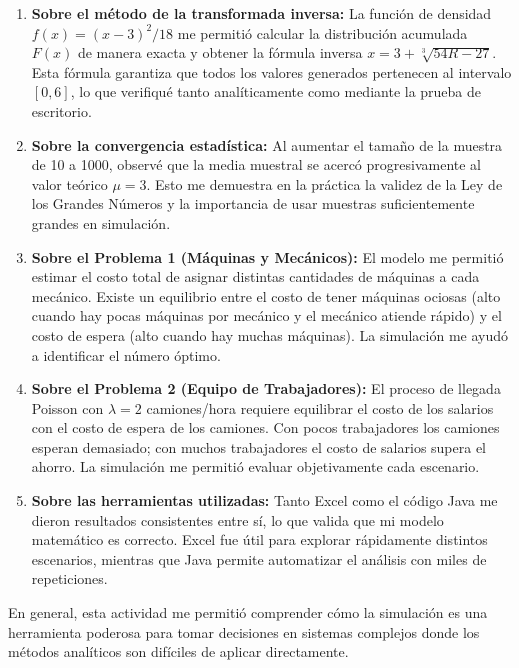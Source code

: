 \documentclass[12pt,a4paper]{article}
\begin{document}
\begin{enumerate}[label=\textbf{\arabic*.}]

  \item \textbf{Sobre el método de la transformada inversa:}
  La función de densidad $f(x) = (x-3)^2/18$ me permitió calcular la distribución acumulada $F(x)$ de manera exacta y obtener la fórmula inversa $x = 3 + \sqrt[3]{54R-27}$. Esta fórmula garantiza que todos los valores generados pertenecen al intervalo $[0, 6]$, lo que verifiqué tanto analíticamente como mediante la prueba de escritorio.

  \item \textbf{Sobre la convergencia estadística:}
  Al aumentar el tamaño de la muestra de 10 a 1000, observé que la media muestral se acercó progresivamente al valor teórico $\mu = 3$. Esto me demuestra en la práctica la validez de la Ley de los Grandes Números y la importancia de usar muestras suficientemente grandes en simulación.

  \item \textbf{Sobre el Problema 1 (Máquinas y Mecánicos):}
  El modelo me permitió estimar el costo total de asignar distintas cantidades de máquinas a cada mecánico. Existe un equilibrio entre el costo de tener máquinas ociosas (alto cuando hay pocas máquinas por mecánico y el mecánico atiende rápido) y el costo de espera (alto cuando hay muchas máquinas). La simulación me ayudó a identificar el número óptimo.

  \item \textbf{Sobre el Problema 2 (Equipo de Trabajadores):}
  El proceso de llegada Poisson con $\lambda = 2$ camiones/hora requiere equilibrar el costo de los salarios con el costo de espera de los camiones. Con pocos trabajadores los camiones esperan demasiado; con muchos trabajadores el costo de salarios supera el ahorro. La simulación me permitió evaluar objetivamente cada escenario.

  \item \textbf{Sobre las herramientas utilizadas:}
  Tanto Excel como el código Java me dieron resultados consistentes entre sí, lo que valida que mi modelo matemático es correcto. Excel fue útil para explorar rápidamente distintos escenarios, mientras que Java permite automatizar el análisis con miles de repeticiones.

\end{enumerate}

\medskip
En general, esta actividad me permitió comprender cómo la simulación es una herramienta poderosa para tomar decisiones en sistemas complejos donde los métodos analíticos son difíciles de aplicar directamente.
\end{document}
